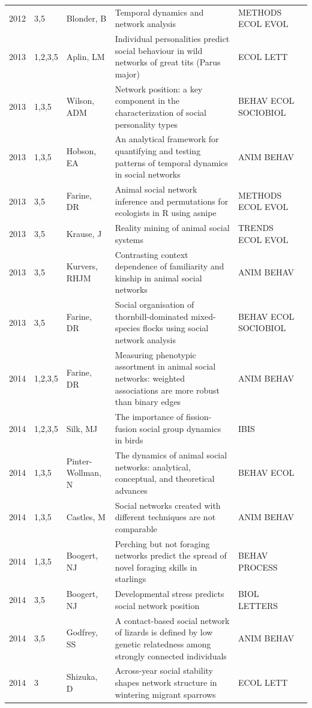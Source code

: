 \documentclass[11pt]{article} %
\begin{document}
\begin{longtable}{p{0.8cm}|p{1.25cm}|p{2.8cm}|p{7.5cm}|p{3cm}l}
2012&	3,5&	Blonder, B&	 Temporal dynamics and network analysis&         	METHODS ECOL EVOL\\
2013&	1,2,3,5&	Aplin, LM&	 Individual personalities predict social behaviour in wild networks of great tits (Parus major)&         	ECOL LETT\\
2013&	1,3,5&	Wilson, ADM&	 Network position: a key component in the characterization of social personality types&         	BEHAV ECOL SOCIOBIOL\\
2013&	1,3,5&	Hobson, EA&	 An analytical framework for quantifying and testing patterns of temporal dynamics in social networks&         	ANIM BEHAV\\
2013&	3,5&	Farine, DR&	 Animal social network inference and permutations for ecologists in R using asnipe&         	METHODS ECOL EVOL\\
2013&	3,5&	Krause, J&	 Reality mining of animal social systems&         	TRENDS ECOL EVOL\\
2013&	3,5&	Kurvers, RHJM&	 Contrasting context dependence of familiarity and kinship in animal social networks&         	ANIM BEHAV\\
2013&	3,5&	Farine, DR&	 Social organisation of thornbill-dominated mixed-species flocks using social network analysis&         	BEHAV ECOL SOCIOBIOL\\
2014&	1,2,3,5&	Farine, DR&	 Measuring phenotypic assortment in animal social networks: weighted associations are more robust than binary edges&         	ANIM BEHAV\\
2014&	1,2,3,5&	Silk, MJ&	 The importance of fission-fusion social group dynamics in birds&         	IBIS\\
2014&	1,3,5&	Pinter-Wollman, N&	 The dynamics of animal social networks: analytical, conceptual, and theoretical advances&         	BEHAV ECOL\\
2014&	1,3,5&	Castles, M&	 Social networks created with different techniques are not comparable&         	ANIM BEHAV\\
2014&	1,3,5&	Boogert, NJ&	 Perching but not foraging networks predict the spread of novel foraging skills in starlings&         	BEHAV PROCESS\\
2014&	3,5&	Boogert, NJ&	 Developmental stress predicts social network position&         	BIOL LETTERS\\
2014&	3,5&	Godfrey, SS&	 A contact-based social network of lizards is defined by low genetic relatedness among strongly connected individuals&         	ANIM BEHAV\\
2014&	3&	Shizuka, D&	 Across-year social stability shapes network structure in wintering migrant sparrows&         	ECOL LETT\\

\end{longtable}
\end{document}
